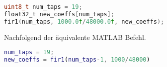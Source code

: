\begin{lstlisting}[language=c]
uint8_t num_taps = 19;
float32_t new_coeffs[num_taps];
fir1(num_taps, 1000.0f/48000.0f, new_coeffs);
\end{lstlisting}


Nachfolgend der äquivalente MATLAB Befehl.



\begin{lstlisting}[language=matlab]
num_taps = 19;
new_coeffs = fir1(num_taps-1, 1000/48000)
\end{lstlisting}



